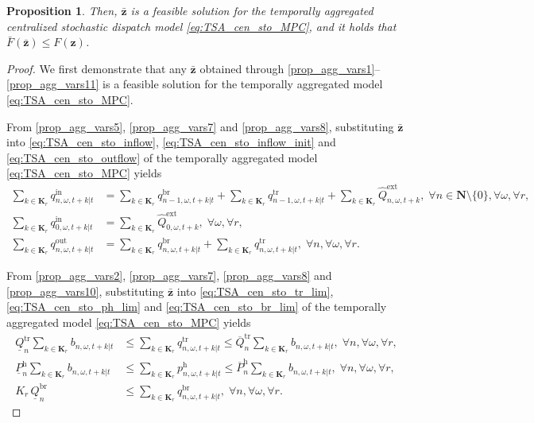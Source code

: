 \documentclass[a4paper,fleqn]{cas-sc}
\newtheorem{proposition}{Proposition}
\begin{document}
\begin{proposition}
Then, $\boldsymbol{\bar{z}}$ is a feasible solution for the temporally aggregated centralized stochastic dispatch model
\eqref{eq:TSA_cen_sto_MPC}, and it holds that $\bar{F}\left(\boldsymbol{\bar{z}}\right) \leq F\left(\boldsymbol{z}\right)$.
\end{proposition}

\begin{proof}
We first demonstrate that any $\boldsymbol{\bar{z}}$ obtained through \eqref{prop_agg_vars1}--\eqref{prop_agg_vars11} is a feasible solution for the temporally aggregated model \eqref{eq:TSA_cen_sto_MPC}.

From \eqref{prop_agg_vars5}, \eqref{prop_agg_vars7} and \eqref{prop_agg_vars8},
substituting $\boldsymbol{\bar{z}}$ into
\eqref{eq:TSA_cen_sto_inflow}, \eqref{eq:TSA_cen_sto_inflow_init} and \eqref{eq:TSA_cen_sto_outflow}
of the temporally aggregated model \eqref{eq:TSA_cen_sto_MPC} yields
\begin{align}
\sum_{k \in \boldsymbol{K}_r} q^{\mathrm{in}}_{n,\omega,t+k|t} & =
\sum_{k \in \boldsymbol{K}_r} q^{\mathrm{br}}_{n-1,\omega,t+k|t}
+
\sum_{k \in \boldsymbol{K}_r} q^{\mathrm{tr}}_{n-1,\omega,t+k|t}
+ \sum_{k \in \boldsymbol{K}_r} \hat{Q}^\mathrm{ext}_{n, \omega, t+k},
\; \forall n \in \boldsymbol{N} \setminus \{0\}, \forall \omega, \forall r,
\label{prop:TSA_cen_sto_inflow}\\
\sum_{k \in \boldsymbol{K}_r} q^{\mathrm{in}}_{0,\omega,t+k|t} & =
\sum_{k \in \boldsymbol{K}_r} \hat{Q}^\mathrm{ext}_{0, \omega, t+k},
\; \forall \omega, \forall r,
\label{prop:TSA_cen_sto_inflow_init}\\
\sum_{k \in \boldsymbol{K}_r} q^{\mathrm{out}}_{n,\omega,t+k|t} & =
\sum_{k \in \boldsymbol{K}_r} q^{\mathrm{br}}_{n,\omega,t+k|t}
+
\sum_{k \in \boldsymbol{K}_r} q^{\mathrm{tr}}_{n,\omega,t+k|t},
\; \forall n, \forall \omega, \forall r.
\label{prop:TSA_cen_sto_outflow}
\end{align}

From \eqref{prop_agg_vars2}, \eqref{prop_agg_vars7}, \eqref{prop_agg_vars8} and \eqref{prop_agg_vars10},
substituting $\boldsymbol{\bar{z}}$ into
\eqref{eq:TSA_cen_sto_tr_lim}, \eqref{eq:TSA_cen_sto_ph_lim} and \eqref{eq:TSA_cen_sto_br_lim}
of the temporally aggregated model \eqref{eq:TSA_cen_sto_MPC} yields
\begin{align}
\underline{Q}^{\mathrm{tr}}_{n}
\sum_{k \in \boldsymbol{K}_r} b_{n,\omega,t+k|t}
& \leq
\sum_{k \in \boldsymbol{K}_r} q^{\mathrm{tr}}_{n,\omega,t+k|t}
\leq
\overline{Q}^{\mathrm{tr}}_{n}
\sum_{k \in \boldsymbol{K}_r} b_{n,\omega,t+k|t},
\; \forall n, \forall \omega, \forall r,
\label{prop:TSA_cen_sto_tr_lim}\\
\underline{P}^{\mathrm{h}}_{n}
\sum_{k \in \boldsymbol{K}_r} b_{n,\omega,t+k|t}
& \leq
\sum_{k \in \boldsymbol{K}_r} p^{\mathrm{h}}_{n,\omega,t+k|t}
\leq
\overline{P}^{\mathrm{h}}_{n}
\sum_{k \in \boldsymbol{K}_r} b_{n,\omega,t+k|t},
\; \forall n, \forall \omega, \forall r,
\label{prop:TSA_cen_sto_ph_lim}\\
K_r \, \underline{Q}^{\mathrm{br}}_{n} & \leq
\sum_{k \in \boldsymbol{K}_r}
q^{\mathrm{br}}_{n, \omega, t+k | t},
\; \forall n, \forall \omega, \forall r.
\label{prop:TSA_cen_sto_br_lim}
\end{align}


\end{proof}
\end{document}
